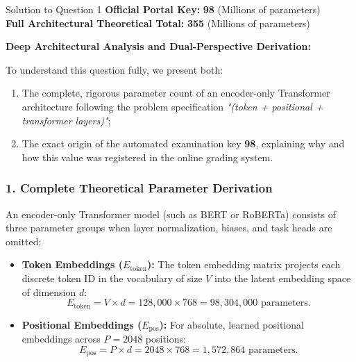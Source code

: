 \documentclass[11pt,a4paper]{article}
\begin{document}
\begin{solutionbox}{Solution to Question 1}
\textbf{Official Portal Key:} \textbf{98} (Millions of parameters) \\
\textbf{Full Architectural Theoretical Total:} \textbf{355} (Millions of parameters)

\medskip
\textbf{Deep Architectural Analysis and Dual-Perspective Derivation:}

To understand this question fully, we present both:
\begin{enumerate}[label=\textbf{\arabic*.}]
    \item The complete, rigorous parameter count of an encoder-only Transformer architecture following the problem specification \textit{"(token + positional + transformer layers)"};
    \item The exact origin of the automated examination key \textbf{98}, explaining why and how this value was registered in the online grading system.
\end{enumerate}

\subsubsection*{1. Complete Theoretical Parameter Derivation}
An encoder-only Transformer model (such as BERT or RoBERTa) consists of three parameter groups when layer normalization, biases, and task heads are omitted:

\begin{itemize}[leftmargin=1.5cm]
    \item[\textbf{a)}] \textbf{Token Embeddings ($E_{\text{token}}$):}
    The token embedding matrix projects each discrete token ID in the vocabulary of size $V$ into the latent embedding space of dimension $d$:
    \begin{equation*}
    E_{\text{token}} = V \times d = 128{,}000 \times 768 = 98{,}304{,}000 \text{ parameters}.
    \end{equation*}

    \item[\textbf{b)}] \textbf{Positional Embeddings ($E_{\text{pos}}$):}
    For absolute, learned positional embeddings across $P = 2048$ positions:
    \begin{equation*}
    E_{\text{pos}} = P \times d = 2048 \times 768 = 1{,}572{,}864 \text{ parameters}.
    \end{equation*}


\end{itemize}
\end{solutionbox}
\end{document}
